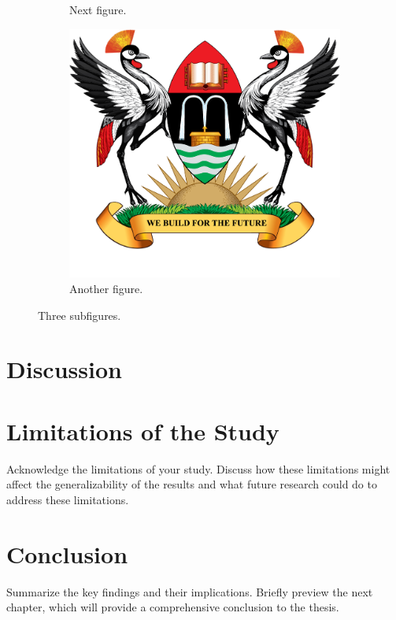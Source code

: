 \begin{figure}[h]
\begin{subfigure}[b]{0.3\textwidth}
         \caption{Next figure.}
         \label{fig2b}
     \end{subfigure}
     \hfill
     \begin{subfigure}[b]{0.3\textwidth}
         \centering
         \includegraphics[width=\textwidth]{images/Mak-Log.png}
         \caption{Another figure.}
         \label{fig2c}
     \end{subfigure}
        \caption{Three subfigures.}
        \label{fig2}
\end{figure}
\section{Discussion}
\section{Limitations of the Study}
Acknowledge the limitations of your study. Discuss how these limitations might affect the generalizability of the results and what future research could do to address these limitations.

\section{Conclusion}
Summarize the key findings and their implications. Briefly preview the next chapter, which will provide a comprehensive conclusion to the thesis.
